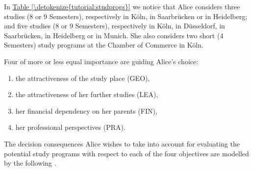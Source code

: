 \documentclass[a4paper,12pt,english]{sphinxhowto}
\begin{document}
In \hyperref[\detokenize{tutorial:studprogs}]{Table \ref{\detokenize{tutorial:studprogs}}} we notice that Alice considers three  studies (8 or 9 Semesters), respectively in Köln, in Saarbrücken or in Heidelberg; and five  studies (8 or 9 Semesters), respectively in Köln, in Düsseldorf, in Saarbrücken, in Heidelberg or in Munich. She also considers two short (4 Semesters) study programs at the Chamber of Commerce in Köln.

Four  of more or less equal importance are guiding Alice’s choice:
\begin{enumerate}
%
\item {} 
 the attractiveness of the study place (GEO),

\item {} 
 the attractiveness of her further studies (LEA),

\item {} 
  her financial dependency on her parents (FIN),

\item {} 
 her professional perspectives (PRA).

\end{enumerate}

The decision consequences Alice wishes to take into account for evaluating the potential study programs with respect to each of the four objectives are modelled by the following  \sphinxfootnotemark[26].
\end{document}
